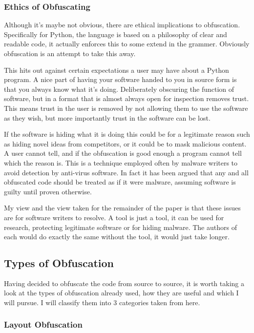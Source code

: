 \documentclass{report}
\begin{document}
\subsubsection{Ethics of Obfuscating}

Although it's maybe not obvious, there are ethical implications to obfuscation. Specifically for Python, the
language is based on a philosophy of clear and readable code, it actually enforces this to some extend in the
grammer. Obviously obfuscation is an attempt to take this away.

This hits out against certain expectations a user may have about a Python program. A nice part of having your
software handed to you in source form is that you always know what it's doing. Deliberately obscuring the
function of software, but in a format that is almost always open for inspection removes trust. This means
trust in the user is removed by not allowing them to use the software as they wish, but more importantly
trust in the software can be lost.

If the software is hiding what it is doing this could be for a legitimate reason such as hiding novel ideas
from competitors, or it could be to mask malicious content. A user cannot tell, and if the obfuscation is
good enough a program cannot tell which the reason is. This is a technique employed often by malware
writers to avoid detection by anti-virus software\cite{dycodeobf}. In fact it has been argued that any and
all obfuscated code should be treated as if it were malware\cite{noobf}, assuming software is guilty until
proven otherwise.

My view and the view taken for the remainder of the paper is that these issues are for software writers to
resolve. A tool is just a tool, it can be used for research, protecting legitimate software or for hiding
malware. The authors of each would do exactly the same without the tool, it would just take longer.

\subsection{Types of Obfuscation}

Having decided to obfuscate the code from source to source, it is worth taking a look at the types of
obfuscation already used, how they are useful and which I will pursue. I will classify them into 3 categories
taken from here\cite[p10]{desevobf}.

\subsubsection{Layout Obfuscation}
\end{document}
